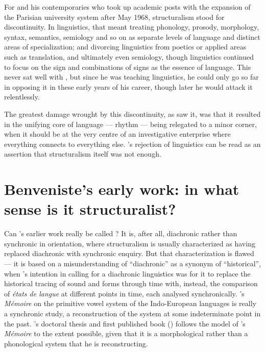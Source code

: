 \documentclass[output=paper]{langscibook}
\begin{document}
For {\Meschonnic} and his contemporaries who took up academic posts with the expansion of the Parisian university system after May 1968, structuralism stood for discontinuity. In linguistics, that meant treating phonology, prosody, morphology, syntax, semantics, semiology and so on as separate levels of language and distinct areas of specialization; and divorcing linguistics from poetics or applied areas such as translation, and ultimately even semiology, though linguistics continued to focus on the sign and combinations of signs as the essence of language. This never sat well with {\Meschonnic}, but since he was teaching linguistics, he could only go so far in opposing it in these early years of his career, though later he would attack it relentlessly.

The greatest damage wrought by this discontinuity, as {\Meschonnic} saw it, was that it resulted in the unifying core of language — rhythm — being relegated to a minor corner, when it should be at the very centre of an investigative enterprise where everything connects to everything else. {\Meschonnic}'s rejection of  linguistics can be read as an assertion that structuralism itself was not  enough.

\section{Benveniste’s early work: in what sense is it structuralist?}
\label{sec:joseph:earlywork}

Can {\Benveniste}'s earlier work really be called ? It is, after all, diachronic rather than synchronic in orientation, where structuralism is usually characterized as having replaced diachronic with synchronic enquiry. But that characterization is flawed — it is based on a misunderstanding of ``diachronic'' as a synonym of ``historical'', when {\Saussure}'s intention in calling for a diachronic linguistics was for it to replace the historical tracing of sound and forms through time with, instead, the comparison of \emph{états de langue} at different points in time, each analysed synchronically. {\Saussure}'s \citeyear{Saussure1879} \emph{Mémoire} on the primitive vowel system of the Indo-European languages is really a synchronic study, a reconstruction of the system at some indeterminate point in the past. {\Benveniste}'s doctoral thesis and first published book (\citeyear{Benveniste1935}) follows the model of {\Saussure}'s \emph{Mémoire} to the extent possible, given that it is a morphological rather than a phonological system that he is reconstructing. 
\end{document}

